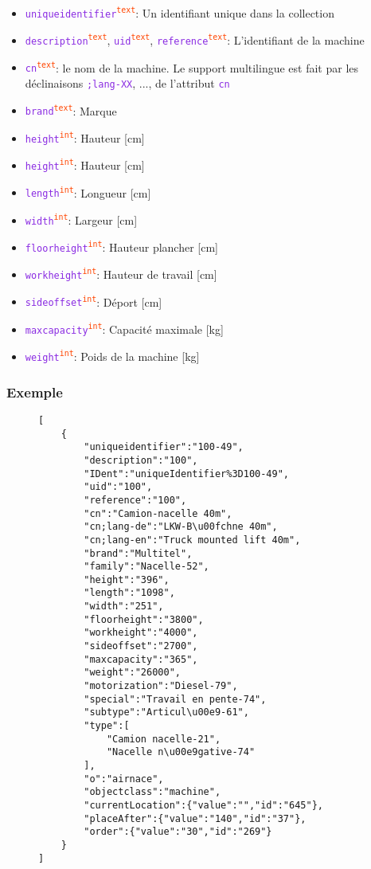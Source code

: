 \documentclass[a4paper,twoside]{article}
\newcommand{\attribut}[1]{\textcolor{BlueViolet}{\texttt{#1}}}
\newcommand{\type}[1]{\textcolor{OrangeRed}{\textsuperscript{\texttt{#1}}}}
\begin{document}
\begin{itemize}
  \item \attribut{uniqueidentifier}\type{text}: Un identifiant unique dans la collection
  \item \attribut{description}\type{text}, \attribut{uid}\type{text}, \attribut{reference}\type{text}: L'identifiant de la machine
  \item \attribut{cn}\type{text}: le nom de la machine. Le support multilingue est fait par les déclinaisons \attribut{;lang-XX}, ..., de l'attribut \attribut{cn}
  \item \attribut{brand}\type{text}: Marque
  \item \attribut{height}\type{int}: Hauteur [cm]
  \item \attribut{height}\type{int}: Hauteur [cm]
  \item \attribut{length}\type{int}: Longueur [cm]
  \item \attribut{width}\type{int}: Largeur [cm]
  \item \attribut{floorheight}\type{int}: Hauteur plancher [cm]
  \item \attribut{workheight}\type{int}: Hauteur de travail [cm]
  \item \attribut{sideoffset}\type{int}: Déport [cm]
  \item \attribut{maxcapacity}\type{int}: Capacité maximale [kg]
  \item \attribut{weight}\type{int}: Poids de la machine [kg]
\end{itemize}
    
\subsubsection{Exemple}

\begin{figure}
    \begin{verbatim}
[
	{
		"uniqueidentifier":"100-49",
		"description":"100",
		"IDent":"uniqueIdentifier%3D100-49",
		"uid":"100",
		"reference":"100",
		"cn":"Camion-nacelle 40m",
		"cn;lang-de":"LKW-B\u00fchne 40m",
		"cn;lang-en":"Truck mounted lift 40m",
		"brand":"Multitel",
		"family":"Nacelle-52",
		"height":"396",
		"length":"1098",
		"width":"251",
		"floorheight":"3800",
		"workheight":"4000",
		"sideoffset":"2700",
		"maxcapacity":"365",
		"weight":"26000",
		"motorization":"Diesel-79",
		"special":"Travail en pente-74",
		"subtype":"Articul\u00e9-61",
		"type":[
			"Camion nacelle-21",
			"Nacelle n\u00e9gative-74"
		],
	   	"o":"airnace",
	   	"objectclass":"machine",
		"currentLocation":{"value":"","id":"645"},
		"placeAfter":{"value":"140","id":"37"},
		"order":{"value":"30","id":"269"}
	}
]
    \end{verbatim}
\end{figure}
\end{document}
